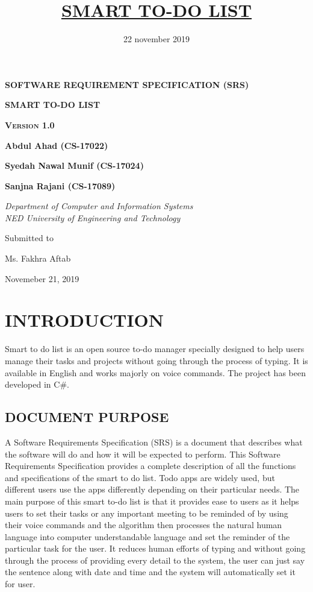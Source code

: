 \documentclass[12pt, a4paper]{report}
\title{\textbf{\underline{SMART TO-DO LIST}}}
\date{22 november 2019}
\begin{document}
\begin{titlepage}

\centering
{\scshape\bfseries\LARGE SOFTWARE REQUIREMENT SPECIFICATION (SRS) \par}
\vspace{1cm}
{\scshape\bfseries\huge SMART TO-DO LIST \par}
\vspace{1cm}
{\scshape\bfseries\huge Version 1.0 \par}
\vspace{2cm}
{\LARGE\bfseries Abdul Ahad (CS-17022) \par}
\vspace{1cm}
{\LARGE\bfseries Syedah Nawal Munif (CS-17024) \par}
\vspace{1cm}
{\LARGE\bfseries Sanjna Rajani (CS-17089) \par}
\vspace{2.5cm}
{\Large\itshape Department of Computer and Information Systems \\ NED University of Engineering and Technology\par}

\vfill
Submitted to\par
Ms. Fakhra Aftab \textsc
\vfill
{\large Novemeber 21, 2019 \par}
	
\end{titlepage}


\tableofcontents

\chapter{INTRODUCTION}
Smart to do list  is an open source to-do manager specially designed to help users manage their tasks and  projects without going through the process of typing. It is available in English and works majorly on voice commands. The project has been developed in C\#. 
\section{DOCUMENT PURPOSE }
A Software Requirements Specification (SRS) is a document that describes what the software will do and how it will be expected to perform. This Software Requirements Specification provides a complete description of all the functions and specifications of the smart to do list.  
Todo apps are widely used, but different users use the apps differently depending on their particular needs.
The main purpose of this smart to-do list is that it provides ease to users as it helps users to set their tasks or any important meeting to be reminded of by using their voice commands and the algorithm then processes the natural human language into computer understandable language and set the reminder of the particular task for the user. It reduces human efforts of typing and without going through the process of providing every detail to the system, the user can just say the sentence along with date and time and the system will automatically set it for user.
\newpage
\end{document}

